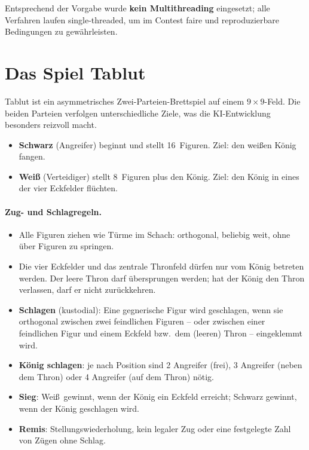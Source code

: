 \documentclass[11pt,a4paper]{article}
\begin{document}
Entsprechend der Vorgabe wurde \textbf{kein Multithreading} eingesetzt; alle
Verfahren laufen single-threaded, um im Contest faire und reproduzierbare
Bedingungen zu gew\"ahrleisten.

\section{Das Spiel Tablut}\label{sec:tablut}
Tablut ist ein asymmetrisches Zwei-Parteien-Brettspiel auf einem
$9\times 9$-Feld.
Die beiden Parteien verfolgen unterschiedliche Ziele, was die KI-Entwicklung
besonders reizvoll macht.

\begin{itemize}[noitemsep]
  \item \textbf{Schwarz} (Angreifer) beginnt und stellt 16~Figuren.
        Ziel: den wei\ss en K\"onig fangen.
  \item \textbf{Wei\ss} (Verteidiger) stellt 8~Figuren plus den K\"onig.
        Ziel: den K\"onig in eines der vier Eckfelder fl\"uchten.
\end{itemize}

\paragraph{Zug- und Schlagregeln.}
\begin{itemize}[noitemsep]
  \item Alle Figuren ziehen wie T\"urme im Schach: orthogonal, beliebig weit,
        ohne \"uber Figuren zu springen.
  \item Die vier Eckfelder und das zentrale Thronfeld d\"urfen nur vom K\"onig
        betreten werden.
        Der leere Thron darf \"ubersprungen werden; hat der K\"onig den Thron
        verlassen, darf er nicht zur\"uckkehren.
  \item \textbf{Schlagen} (kustodial): Eine gegnerische Figur wird geschlagen,
        wenn sie orthogonal zwischen zwei feindlichen Figuren -- oder zwischen
        einer feindlichen Figur und einem Eckfeld bzw.\ dem (leeren) Thron --
        eingeklemmt wird.
  \item \textbf{K\"onig schlagen}: je nach Position sind 2 Angreifer (frei),
        3 Angreifer (neben dem Thron) oder 4 Angreifer (auf dem Thron) n\"otig.
  \item \textbf{Sieg}: Wei\ss\ gewinnt, wenn der K\"onig ein Eckfeld erreicht;
        Schwarz gewinnt, wenn der K\"onig geschlagen wird.
  \item \textbf{Remis}: Stellungswiederholung, kein legaler Zug oder eine
        festgelegte Zahl von Z\"ugen ohne Schlag.
\end{itemize}
\end{document}
